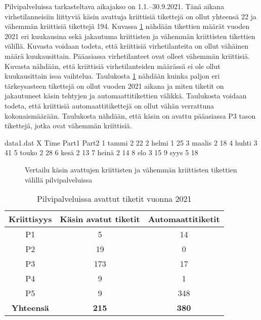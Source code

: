 Pilvipalveluissa tarkasteltava aikajakso on 1.1.--30.9.2021. Tänä aikana virhetilanneisiin liittyviä käsin avattuja kriittisiä tikettejä on ollut yhteensä 22 ja vähemmän kriittisiä tikettejä 194. Kuvassa \ref{fig:pilvitiketit} nähdään tikettien määrät vuoden 2021 eri kuukausina sekä jakautuma kriittisten ja vähemmän kriittisten tikettien välillä. Kuvasta voidaan todeta, että kriittisiä virhetilanteita on ollut vähäinen määrä kuukausittain. Pääasiassa virhetilanteet ovat olleet vähemmän kriittisiä. Kuvasta nähdään, että kriittisiä virhetilanteiden määrässä ei ole ollut kuukausittain isoa vaihtelua. Taulukosta \ref{table:automaatti} nähdään kuinka paljon eri tärkeysasteen tikettejä on ollut vuoden 2021 aikana ja miten tiketit on jakautuneet käsin tehtyjen ja automaattitikettien välikkä. Taulukosta voidaan todeta, että kriittisiä automaattitikettejä on ollut vähän verrattuna kokonaismäärään. Taulukosta nähdään, että käsin on avattu pääasiassa P3 tason tikettejä, jotka ovat vähemmän kriittisiä.

\begin{filecontents}{data1.dat}
X Time  	Part1  Part2
1 tammi  	2	22
2 helmi		1	25
3 maalis	2	18
4 huhti		3	41
5 touko		2	28
6 kesä		2	13
7 heinä		2	14
8 elo       3   15
9 syys      5   18
\end{filecontents}

\begin{figure}[ht]
\caption{Vertailu käsin avattujen kriittisten ja vähemmän kriittisten tikettien välillä pilvipalveluissa}
\label{fig:pilvitiketit}
\end{figure}

\begin{table}[ht]
\centering
\begin{tabular}{||c c c||} 
 \hline
 Kriittisyys & Käsin avatut tiketit & Automaattitiketit \\ [0.5ex] 
 \hline\hline
 P1 & 5 & 14 \\ 
 P2 & 19 & 0 \\
 P3 & 173 & 17 \\
 P4 & 9 & 1 \\
 P5 & 9 & 348 \\
 \textbf{Yhteensä} & \textbf{215} & \textbf{380}\\ [1ex] 
 \hline
\end{tabular}
\caption{Pilvipalveluissa avattut tiketit vuonna 2021}
\label{table:automaatti}
\end{table}

